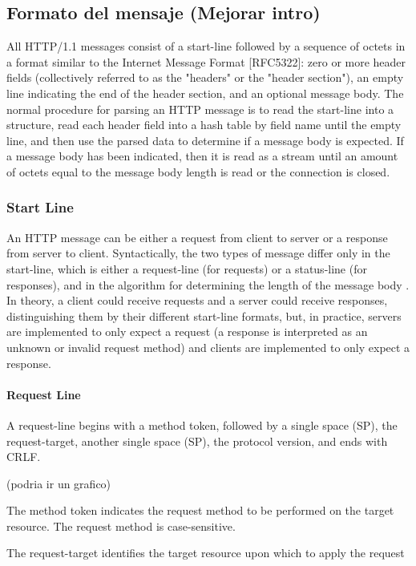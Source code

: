 \subsection{Formato del mensaje (Mejorar intro)}

All HTTP/1.1 messages consist of a start-line followed by a sequence
of octets in a format similar to the Internet Message Format
[RFC5322]: zero or more header fields (collectively referred to as
the "headers" or the "header section"), an empty line indicating the
end of the header section, and an optional message body.
The normal procedure for parsing an HTTP message is to read the
   start-line into a structure, read each header field into a hash table
   by field name until the empty line, and then use the parsed data to
   determine if a message body is expected.  If a message body has been
   indicated, then it is read as a stream until an amount of octets
   equal to the message body length is read or the connection is closed.

 
\subsubsection{Start Line}
An HTTP message can be either a request from client to server or a
   response from server to client.  Syntactically, the two types of
   message differ only in the start-line, which is either a request-line
   (for requests) or a status-line (for responses), and in the algorithm
   for determining the length of the message body .
   In theory, a client could receive requests and a server could receive
   responses, distinguishing them by their different start-line formats,
   but, in practice, servers are implemented to only expect a request (a
   response is interpreted as an unknown or invalid request method) and
   clients are implemented to only expect a response.

     
\paragraph{Request Line}
A request-line begins with a method token, followed by a single space
   (SP), the request-target, another single space (SP), the protocol
   version, and ends with CRLF.

     (podria ir un grafico)

   The method token indicates the request method to be performed on the
   target resource.  The request method is case-sensitive.


   The request-target identifies the target resource upon which to apply
   the request



